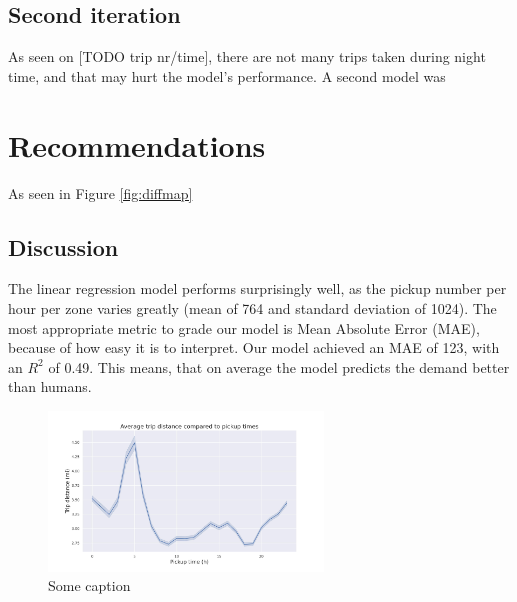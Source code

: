 \documentclass[11pt]{article}
\begin{document}
\subsection{Second iteration}

As seen on [TODO trip nr/time], there are not many trips taken during night time, and that may hurt the model's performance. A second model was 

\section{Recommendations}
As seen in Figure \autoref{fig:diffmap}


\subsection{Discussion} \label{discussion}

The linear regression model performs surprisingly well, as the pickup number per hour per zone varies greatly (mean of 764 and standard deviation of 1024). The most appropriate metric to grade our model is Mean Absolute Error (MAE), because of how easy it is to interpret. Our model achieved an MAE of 123, with an $R^2$ of 0.49. This means, that on average the model predicts the demand better than humans.

\begin{figure}[h]
    \includegraphics[width=0.65\textwidth]{pickuptime_distance.jpeg}
    \centering
    \caption{Some caption} %
\end{figure}
\end{document}
